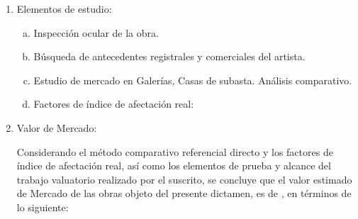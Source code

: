 \begin{enumerate}[1.]
\item Elementos de estudio:

\begin{enumerate}[a.]

\item Inspecci\'on ocular de la obra.

\item B\'usqueda de antecedentes registrales y comerciales del artista. 
\item Estudio de mercado en Galer\'ias, Casas de subasta. An\'alisis comparativo.

\item Factores de \'indice de afectaci\'on real:

\end{enumerate}

\item Valor de Mercado:

Considerando el m\'etodo comparativo referencial directo y los factores de \'indice de afectaci\'on real, as\'i como los elementos de prueba y alcance del trabajo valuatorio realizado por el suscrito, se concluye que el valor estimado de Mercado de las obras objeto del presente dictamen, es de \insertar, en t\'erminos de lo siguiente:\\

\insertar

\end{enumerate}



